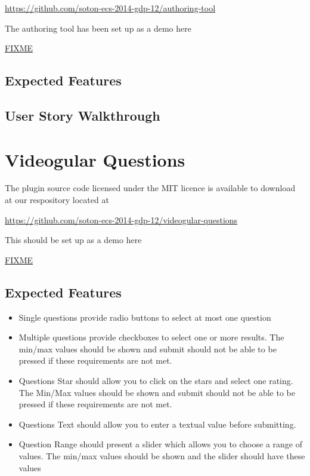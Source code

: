\documentclass[12pt,a4paper]{article}
\begin{document}
\url{https://github.com/soton-ecs-2014-gdp-12/authoring-tool}

The authoring tool has been set up as a demo here

\url{FIXME}

\subsection{Expected Features}



\subsection{User Story Walkthrough}

\section{Videogular Questions}

The plugin source code licensed under the MIT licence is available to download at our respository located at 

\url{https://github.com/soton-ecs-2014-gdp-12/videogular-questions}

This should be set up as a demo here

\url{FIXME}

\subsection{Expected Features}

\begin{itemize}
\item Single questions provide radio buttons to select at most one question
\item Multiple questions provide checkboxes to select one or more results. The min/max values should be shown and submit should not be able to be pressed if these requirements are not met.
\item Questions Star should allow you to click on the stars and select one rating. The Min/Max values should be shown and submit should not be able to be pressed if these requirements are not met.
\item Questions Text should allow you to enter a textual value before submitting.
\item Question Range should present a slider which allows you to choose a range of values. The min/max values should be shown and the slider should have these values
\end{itemize}
\end{document}
